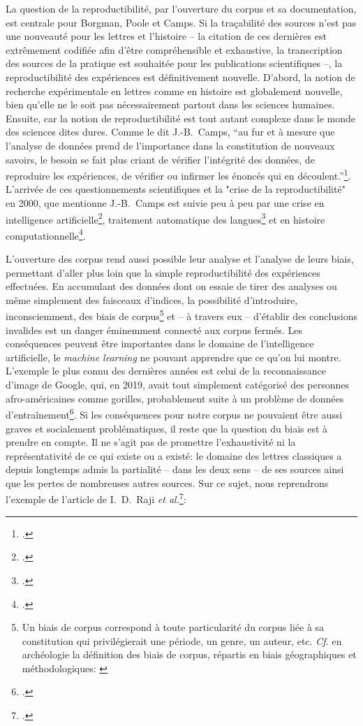 La question de la reproductibilité, par l'ouverture du corpus et sa documentation, est centrale pour Borgman, Poole et Camps. Si la traçabilité des sources n'est pas une nouveauté pour les lettres et l'histoire -- la citation de ces dernières est extrêmement codifiée afin d'être compréhensible et exhaustive, la transcription des sources de la pratique est souhaitée pour les publications scientifiques --, la reproductibilité des expériences est définitivement nouvelle. D'abord, la notion de recherche expérimentale en lettres comme en histoire est globalement nouvelle, bien qu'elle ne le soit pas nécessairement partout dans les sciences humaines. Ensuite, car la notion de reproductibilité est tout autant complexe dans le monde des sciences dites dures. Comme le dit J.-B.~Camps, ``au fur et à mesure que l’analyse de données prend de l’importance dans la constitution de nouveaux savoirs, le besoin se fait plus criant de vérifier l’intégrité des données, de reproduire les expériences, de vérifier ou infirmer les énoncés qui en découlent.''\footcite{camps_ou_2018}. L'arrivée de ces questionnements scientifiques et la "crise de la reproductibilité" en 2000, que mentionne J.-B.~Camps est suivie peu à peu par une crise en intelligence artificielle\footcite{hutson2018artificial}, traitement automatique des langues\footcite{belz2021systematic} et en histoire computationnelle\footcite{eijnatten_big_2013}.

L'ouverture des corpus rend aussi possible leur analyse et l'analyse de leurs biais, permettant d'aller plus loin que la simple reproductibilité des expériences effectuées. En accumulant des données dont on essaie de tirer des analyses ou même simplement des faisceaux d'indices, la possibilité d'introduire, inconsciemment, des biais de corpus\footnote{Un biais de corpus correspond à toute particularité du corpus liée à sa constitution qui privilégierait une période, un genre, un auteur, etc. \textit{Cf.} en archéologie la définition des biais de corpus, répartis en biais géographiques et méthodologiques: \textcite[p.~144]{resch:tel-03218240}} et -- à travers eux -- d'établir des conclusions invalides est un danger éminemment connecté aux corpus fermés. Les conséquences peuvent être importantes dans le domaine de l'intelligence artificielle, le \textit{machine learning} ne pouvant apprendre que ce qu'on lui montre. L'exemple le plus connu des dernières années est celui de la reconnaissance d'image de Google, qui, en 2019, avait tout simplement catégorisé des personnes afro-américaines comme gorilles, probablement suite à un problème de données d'entraînement\footcite{lohr2018facial, chokshi2019facial}. Si les conséquences pour notre corpus ne pouvaient être aussi graves et socialement problématiques, il reste que la question du biais est à prendre en compte. Il ne s'agit pas de promettre l'exhaustivité ni la représentativité de ce qui existe ou a existé: le domaine des lettres classiques a depuis longtemps admis la partialité -- dans les deux sens -- de ses sources ainsi que les pertes de nombreuses autres sources. Sur ce sujet, nous reprendrons l'exemple de l'article de I.~D.~Raji \textit{et al.}\footcite{raji2021ai}:

